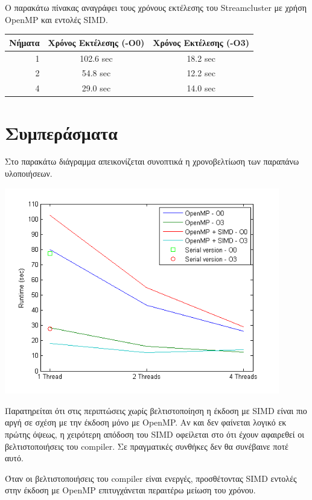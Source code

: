 \documentclass[a4paper,11pt]{article}
\begin{document}
Ο παρακάτω πίνακας αναγράφει τους χρόνους εκτέλεσης του Streamcluster με χρήση OpenMP και εντολές SIMD.

\begin{center}
\begin{tabular}{|r|c|c|}
    \hline
    Νήματα & Χρόνος Εκτέλεσης (-O0) & Χρόνος Εκτέλεσης (-Ο3) \\ \hline
    1 & 102.6 sec & 18.2 sec \\
    2 & 54.8 sec & 12.2 sec \\
    4 & 29.0 sec & 14.0 sec \\ \hline
\end{tabular}
\end{center}

\section{Συμπεράσματα}
Στο παρακάτω διάγραμμα απεικονίζεται συνοπτικά η χρονοβελτίωση των παραπάνω υλοποιήσεων.
\begin{center}
\includegraphics[width=0.9\textwidth]{../scrshots/results.png}
\end{center} 

Παρατηρείται ότι στις περιπτώσεις χωρίς βελτιστοποίηση η έκδοση με SIMD είναι πιο αργή σε σχέση με την έκδοση μόνο με OpenMP. Αν και δεν φαίνεται λογικό εκ πρώτης όψεως, η χειρότερη απόδοση του SIMD οφείλεται στο ότι έχουν αφαιρεθεί οι βελτιστοποιήσεις του compiler. Σε πραγματικές συνθήκες δεν θα συνέβαινε ποτέ αυτό.

Όταν οι βελτιστοποιήσεις του compiler είναι ενεργές, προσθέτοντας SIMD εντολές στην έκδοση με OpenMP επιτυγχάνεται περαιτέρω μείωση του χρόνου.
\end{document}

